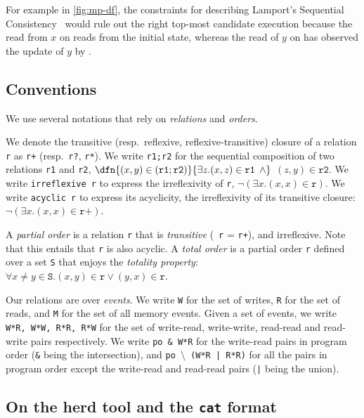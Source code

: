 \documentclass[a4paper]{article}
\begin{document}
For example in \myfig\ref{fig:mp-df}, the constraints for describing Lamport's
Sequential Consistency~\cite{lam79} would rule out the right top-most candidate
execution because the read from $x$ on  reads from the initial state,
whereas the read of $y$ on  has observed the update of $y$ by .

\subsection{Conventions \label{sec:conventions}}

We use several notations that rely on \emph{relations} and \emph{orders}. 

We denote the transitive (resp.~reflexive, reflexive-transitive) closure of a
relation {\tt r} as {\tt r+} (resp.~{\tt r?}, {\tt r*}).  We write {\tt r1;r2}
for the sequential composition of two relations {\tt r1} and {\tt r2}, \ie
$\dfn{(x,y) \in (\texttt{r1};\texttt{r2})}{\exists z.  (x,z) \in \texttt{r1}
\:\:\wedge}$ $(z,y) \in \texttt{r2}$. We write {\tt irreflexive r} to express
the irreflexivity of {\tt r}, \ie $\neg(\exists x. (x,x) \in \texttt{r})$. We
write {\tt acyclic r} to express its acyclicity, \ie the irreflexivity of its
transitive closure: $\neg(\exists x.  (x,x) \in \texttt{r+})$.

A \emph{partial order} is a relation {\tt r} that is \emph{transitive}
(\ie~{\tt r} = {\tt r+}), and irreflexive. Note that this entails that {\tt r}
is also acyclic. A \emph{total order} is a partial order {\tt r} defined over a
set {\tt S} that enjoys the \emph{totality property}: $\forall x \neq y \in
\texttt{S}. (x,y) \in \texttt{r} \vee (y,x) \in \texttt{r}$.

Our relations are over \emph{events}. We write {\tt W} for the set of writes,
{\tt R} for the set of reads, and {\tt M} for the set of all memory events.
Given a set of events, we write {\tt W*R, W*W, R*R, R*W} for the set of
write-read, write-write, read-read and read-write pairs respectively.  We write
{\tt po \& W*R} for the write-read pairs in program order ({\tt \&} being the
intersection), and {\tt po $\setminus$ (W*R | R*R)} for all the pairs in
program order except the write-read and read-read pairs ({\tt |} being the
union).  
 
\subsection{On the {\sf herd} tool and the {\tt cat} format \label{sec:herd}}
\end{document}
